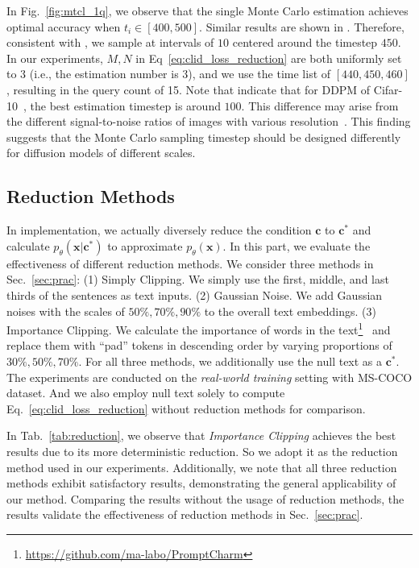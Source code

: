 \documentclass{article}
\theoremstyle{plain}
\theoremstyle{remark}
\begin{document}
In Fig.~\ref{fig:mtcl_1q}, we observe that the single Monte Carlo estimation achieves optimal accuracy when $t_i \in [400,500]$. Similar results are shown in \cite{li2023your}. Therefore, consistent with \cite{li2023your}, we sample at intervals of $10$ centered around the timestep $450$.
In our experiments,   
$M,N$ in Eq~\eqref{eq:clid_loss_reduction} are both uniformly set to $3$ (i.e., the estimation number
is $3$), and we use the time list of $[440,450,460]$, resulting in the query count of 15.
Note that \cite{carlini2023extracting,duan2023diffusion} indicate that for DDPM of Cifar-10~\cite{krizhevsky2009learning}, the best estimation timestep is around $100$. 
This difference may arise from the different signal-to-noise ratios of images with various resolution~\cite{hoogeboom2023simple}.
This finding suggests that the Monte Carlo sampling timestep should be designed differently for diffusion models of different scales.

\subsection{Reduction Methods}



In implementation, we actually diversely reduce the condition $\mathbf{c}$ to $\mathbf{c}^*$ and calculate $p_\theta(\mathbf{x} | \mathbf{c}^*)$ to approximate $p_\theta(\mathbf{x} )$.
In this part, we evaluate the effectiveness of different reduction methods. We consider three methods in Sec.~\ref{sec:prac}: (1) Simply Clipping. We simply use the first, middle, and last thirds of the sentences as text inputs. (2) Gaussian Noise. We add Gaussian noises with the scales of $50\%,70\%,90\%$ to the overall text embeddings. (3) Importance Clipping.  We calculate the importance of words in the text\footnote{\url{https://github.com/ma-labo/PromptCharm}}~\cite{tang2023daam, wang2024promptcharm} and replace them with “pad” tokens in descending order by varying proportions of $30\%,50\%,70\%$. For all three methods, we additionally use the null text as a $\mathbf{c}^*$. The experiments are conducted on the \textit{real-world training} setting with MS-COCO dataset. And we also employ null text solely to compute Eq.~\eqref{eq:clid_loss_reduction} without reduction methods for comparison. 

In Tab.~\ref{tab:reduction}, we observe that \textit{Importance Clipping} achieves the best results due to its more deterministic reduction. So we adopt it as the reduction method used in our experiments. Additionally, we note that all three reduction methods exhibit satisfactory results, demonstrating the general applicability of our method. Comparing the results without the usage of reduction methods, the results validate the effectiveness of reduction methods in Sec.~\ref{sec:prac}.
\end{document}
